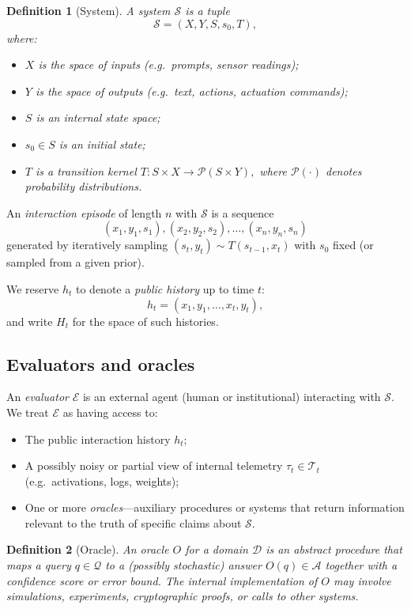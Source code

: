 \documentclass[11pt]{article}
\newtheorem{definition}{Definition}
\newcommand{\1}{\mathbf{1}}
\begin{document}
\begin{definition}[System]
A \emph{system} $\mathcal{S}$ is a tuple
\[
  \mathcal{S} = (X, Y, S, s_0, T),
\]
where:
\begin{itemize}[leftmargin=2em]
  \item $X$ is the space of inputs (e.g.~prompts, sensor readings);
  \item $Y$ is the space of outputs (e.g.~text, actions, actuation commands);
  \item $S$ is an internal state space;
  \item $s_0 \in S$ is an initial state;
  \item $T$ is a transition kernel
  \(
    T : S \times X \to \mathcal{P}(S \times Y),
  \)
  where $\mathcal{P}(\cdot)$ denotes probability distributions.
\end{itemize}
\end{definition}

An \emph{interaction episode} of length $n$ with $\mathcal{S}$ is a sequence
\[
  (x_1, y_1, s_1), (x_2, y_2, s_2), \dots, (x_n, y_n, s_n)
\]
generated by iteratively sampling $(s_t, y_t) \sim T(s_{t-1}, x_t)$ with
$s_0$ fixed (or sampled from a given prior).

We reserve $h_t$ to denote a \emph{public history} up to time $t$:
\[
  h_t = (x_1, y_1, \dots, x_t, y_t),
\]
and write $H_t$ for the space of such histories.

\subsection{Evaluators and oracles}

An \emph{evaluator} $\mathcal{E}$ is an external agent (human or institutional)
interacting with $\mathcal{S}$.
We treat $\mathcal{E}$ as having access to:

\begin{itemize}[leftmargin=2em]
  \item The public interaction history $h_t$;
  \item A possibly noisy or partial view of internal telemetry
  $\tau_t \in \mathcal{T}_t$ (e.g.~activations, logs, weights);
  \item One or more \emph{oracles}---auxiliary procedures or systems that
  return information relevant to the truth of specific claims about $\mathcal{S}$.
\end{itemize}

\begin{definition}[Oracle]
An \emph{oracle} $O$ for a domain $\mathcal{D}$ is an abstract procedure
that maps a query $q \in \mathcal{Q}$ to a (possibly stochastic) answer
$O(q) \in \mathcal{A}$ together with a confidence score or error bound.
The internal implementation of $O$ may involve simulations, experiments,
cryptographic proofs, or calls to other systems.
\end{definition}
\end{document}
